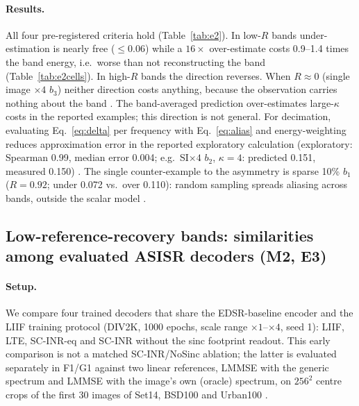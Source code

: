 \paragraph{Results.} All four pre-registered criteria hold
(Table~\ref{tab:e2}). In low-$R$ bands under-estimation is nearly free
($\le0.06$) while a $16\times$ over-estimate costs 0.9--1.4 times the band
energy, i.e.\ worse than not reconstructing the band
(Table~\ref{tab:e2cells}). In high-$R$ bands the direction reverses. When
$R\approx0$ (single image $\times4$ $b_3$) neither direction costs anything,
because the observation carries nothing about the band .
The band-averaged prediction over-estimates large-$\kappa$ costs in the reported examples; this direction is not general. For
decimation, evaluating Eq.~\eqref{eq:delta} per frequency with
Eq.~\eqref{eq:alias} and energy-weighting reduces approximation error in the reported exploratory calculation (exploratory:
Spearman 0.99, median error 0.004; e.g.\ SI$\times4$ $b_2$, $\kappa=4$:
predicted 0.151, measured 0.150) .
The single counter-example to the asymmetry is sparse 10\% $b_1$ ($R=0.92$;
under 0.072 vs.\ over 0.110): random sampling spreads aliasing across bands,
outside the scalar model .

\subsection{Low-reference-recovery bands: similarities among evaluated ASISR decoders (M2, E3)}\label{sec:exp-c}

\paragraph{Setup.} We compare four trained decoders that share the
EDSR-baseline encoder and the LIIF training protocol (DIV2K, 1000 epochs,
scale range $\times1$--$\times4$, seed 1): LIIF, LTE, SC-INR-eq and
SC-INR without the sinc footprint readout. This early comparison is not a matched SC-INR/NoSinc ablation; the latter is evaluated separately in F1/G1
against two linear references, LMMSE with the generic spectrum and LMMSE with
the image's own (oracle) spectrum, on $256^2$ centre crops of the first 30
images of Set14, BSD100 and Urban100 .

